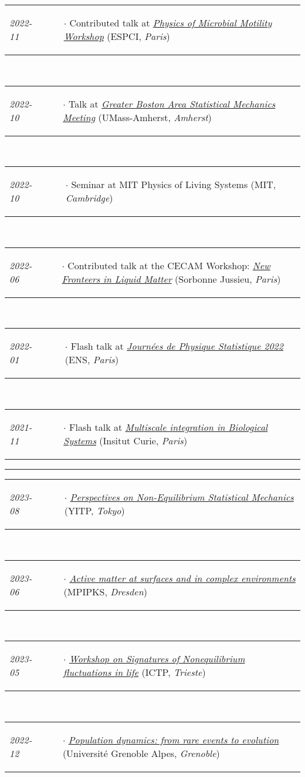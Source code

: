\documentclass{scrartcl}
\newcommand{\NewItemEntry}[2]{
  \noindent
  \begin{tabular}[r]{p{2.5cm} p{14.0cm}}
    \-\hspace{0.5cm} \small \textit{#1}
    &
    \begin{itemize}
      \vspace{-0.65cm}
      \item[$\cdot$] #2
    \end{itemize}
  \end{tabular}
  \vspace{-0.2cm}
}
\begin{document}
\begin{cv}{}
\NewItemEntry{2022-11}{Contributed talk at \textit{\href{https://etn-phymot.eu/phymot-workshop/}{Physics of Microbial Motility Workshop}} (ESPCI, \textit{Paris})}\\[\v]
\NewItemEntry{2022-10}{Talk at \textit{\href{https://sites.google.com/umass.edu/gbasm2022/home}{Greater Boston Area Statistical Mechanics Meeting}} \if{[replacing Prof. Julien Tailleur]}\fi (UMass-Amherst, \textit{Amherst})} \\[\v]
\NewItemEntry{2022-10}{Seminar at MIT Physics of Living Systems (MIT, \textit{Cambridge})}\\[\v]
\NewItemEntry{2022-06}{Contributed talk at the CECAM Workshop: \textit{\href{https://www.cecam.org/workshop-details/1111}{New Fronteers in Liquid Matter}} (Sorbonne Jussieu, \textit{Paris})}\\[\v]
\NewItemEntry{2022-01}{Flash talk at \textit{\href{https://jstat.phys.ens.fr/fr}{Journées de Physique Statistique 2022}} (ENS, \textit{Paris})}\\[\v]
\NewItemEntry{2021-11}{Flash talk at \textit{\href{https://training.institut-curie.org/courses/multiscale-integration-in-biological-systems-3}{Multiscale integration in Biological Systems}} (Insitut Curie, \textit{Paris})}
  
  


\vspace{1em}

\par\noindent\rule{\textwidth}{0.4pt}

\vspace{1.5em}



\noindent{}\vspace{1em}

\NewItemEntry{2023-08}{\textit{\href{https://www2.yukawa.kyoto-u.ac.jp/~yitp-ysf2022/index.php}{Perspectives on Non-Equilibrium Statistical Mechanics}} (YITP, \textit{Tokyo})}\\[\v]
\NewItemEntry{2023-06}{\textit{\href{https://www.pks.mpg.de/amsce23}{Active matter at surfaces and in complex environments}} (MPIPKS, \textit{Dresden})}\\[\v]
\NewItemEntry{2023-05}{\textit{\href{https://indico.ictp.it/event/10169/}{Workshop on Signatures of Nonequilibrium fluctuations in life}} (ICTP, \textit{Trieste})}\\[\v]
\NewItemEntry{2022-12}{\textit{\href{https://everevol.sciencesconf.org/}{Population dynamics: from rare events to evolution}} (Université Grenoble Alpes, \textit{Grenoble})}



\end{cv}
\end{document}
